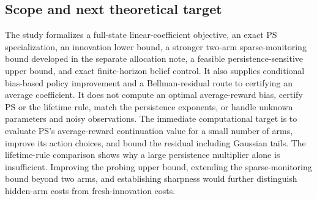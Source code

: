 \subsection{Scope and next theoretical target}
The study formalizes a full-state linear-coefficient objective, an exact PS specialization, an innovation lower bound, a stronger two-arm sparse-monitoring bound developed in the separate allocation note, a feasible persistence-sensitive upper bound, and exact finite-horizon belief control. It also supplies conditional bias-based policy improvement and a Bellman-residual route to certifying an average coefficient. It does not compute an optimal average-reward bias, certify PS or the lifetime rule, match the persistence exponents, or handle unknown parameters and noisy observations. The immediate computational target is to evaluate PS's average-reward continuation value for a small number of arms, improve its action choices, and bound the residual including Gaussian tails. The lifetime-rule comparison shows why a large persistence multiplier alone is insufficient. Improving the probing upper bound, extending the sparse-monitoring bound beyond two arms, and establishing sharpness would further distinguish hidden-arm costs from fresh-innovation costs.

